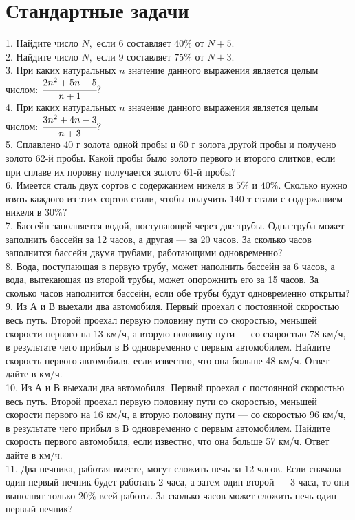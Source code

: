 \documentclass[12pt]{article}
\begin{document}
\section{Стандартные задачи}
1. Найдите число $N,$ если 6 составляет $40\%$ от $N+5.$\\
2. Найдите число $N,$ если 9 составляет $75\%$ от $N+3.$\\
3. При каких натуральных $n$ значение данного выражения является целым числом: $\cfrac{2n^2+5n-5}{n+1}?$\\
4. При каких натуральных $n$ значение данного выражения является целым числом: $\cfrac{3n^2+4n-3}{n+3}?$\\
5. Сплавлено 40 г золота одной пробы и 60 г золота другой пробы и получено золото 62-й пробы. Какой пробы было золото первого и второго слитков, если при сплаве их поровну получается золото 61-й пробы?\\
6. Имеется сталь двух сортов с содержанием никеля в $5\%$ и $40\%.$ Сколько нужно взять каждого из этих сортов стали, чтобы получить 140 т стали с содержанием никеля в $30\%?$\\
7. Бассейн заполняется водой, поступающей через две трубы. Одна труба может заполнить бассейн за 12 часов, а другая --- за 20 часов. За сколько часов заполнится бассейн двумя трубами, работающими одновременно?\\
8. Вода, поступающая в первую трубу, может наполнить бассейн за 6 часов, а вода, вытекающая из второй трубы, может опорожнить его за 15 часов. За сколько часов наполнится бассейн, если обе трубы будут одновременно открыты?\\
9. Из А и В выехали два автомобиля. Первый проехал с постоянной скоростью весь путь. Второй проехал первую половину пути со скоростью, меньшей скорости первого на 13 км/ч, а вторую половину пути --- со скоростью 78 км/ч, в результате чего прибыл в В одновременно с первым автомобилем. Найдите скорость первого автомобиля, если известно, что она больше 48 км/ч. Ответ дайте в км/ч.\\
10. Из А и В выехали два автомобиля. Первый проехал с постоянной скоростью весь путь. Второй проехал первую половину пути со скоростью, меньшей скорости первого на 16 км/ч, а вторую половину пути --- со скоростью 96 км/ч, в результате чего прибыл в В одновременно с первым автомобилем. Найдите скорость первого автомобиля, если известно, что она больше 57 км/ч. Ответ дайте в км/ч.\\
11. Два печника, работая вместе, могут сложить печь за 12 часов. Если сначала один первый печник будет работать 2 часа, а затем один второй --- 3 часа, то они выполнят только $20\%$ всей работы. За сколько часов может сложить печь один первый печник?\\
\end{document}
